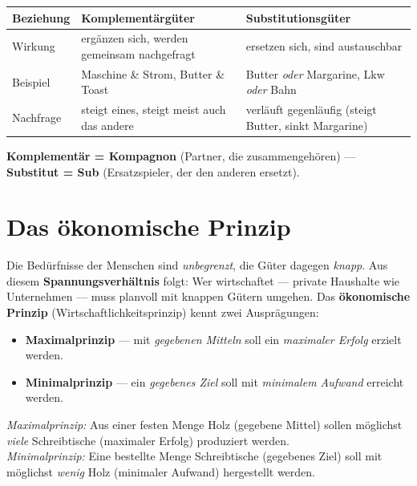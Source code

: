 \documentclass[11pt, a4paper]{article}
\begin{document}
\begin{center}
\begin{tabular}{p{3cm} p{5.5cm} p{5.5cm}}
\toprule
\textbf{Beziehung} & \textbf{Komplementärgüter} & \textbf{Substitutionsgüter}\\
\midrule
Wirkung & ergänzen sich, werden gemeinsam nachgefragt & ersetzen sich, sind austauschbar\\
Beispiel & Maschine \& Strom, Butter \& Toast & Butter \emph{oder} Margarine, Lkw \emph{oder} Bahn\\
Nachfrage & steigt eines, steigt meist auch das andere & verläuft gegenläufig (steigt Butter, sinkt Margarine)\\
\bottomrule
\end{tabular}
\end{center}

\begin{eselsbruecke}
\textbf{Komplementär = Kompagnon} (Partner, die zusammengehören) ---
\textbf{Substitut = Sub} (Ersatzspieler, der den anderen ersetzt).
\end{eselsbruecke}

\section{Das ökonomische Prinzip}

Die Bedürfnisse der Menschen sind \emph{unbegrenzt}, die Güter dagegen \emph{knapp}. Aus
diesem \textbf{Spannungsverhältnis} folgt: Wer wirtschaftet --- private Haushalte wie
Unternehmen --- muss planvoll mit knappen Gütern umgehen. Das \textbf{ökonomische Prinzip}
(Wirtschaftlichkeitsprinzip) kennt zwei Ausprägungen:

\begin{itemize}
  \item \textbf{Maximalprinzip} --- mit \emph{gegebenen Mitteln} soll ein \emph{maximaler
    Erfolg} erzielt werden.
  \item \textbf{Minimalprinzip} --- ein \emph{gegebenes Ziel} soll mit \emph{minimalem
    Aufwand} erreicht werden.
\end{itemize}

\begin{beispiel}
\emph{Maximalprinzip:} Aus einer festen Menge Holz (gegebene Mittel) sollen möglichst
\emph{viele} Schreibtische (maximaler Erfolg) produziert werden. \\
\emph{Minimalprinzip:} Eine bestellte Menge Schreibtische (gegebenes Ziel) soll mit
möglichst \emph{wenig} Holz (minimaler Aufwand) hergestellt werden.
\end{beispiel}
\end{document}

